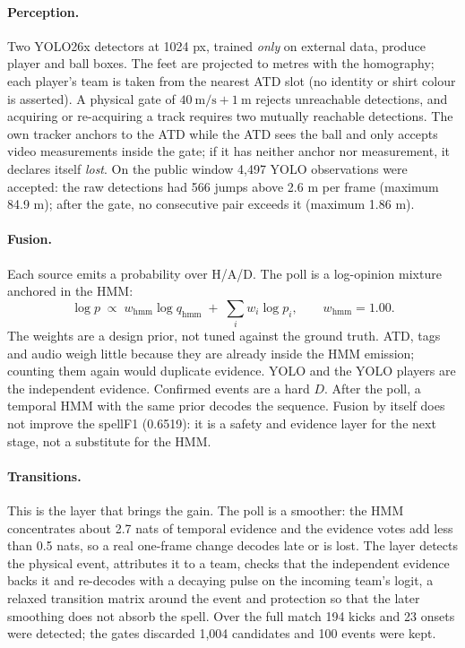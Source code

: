 \documentclass[10pt,a4paper]{article}
\begin{document}
\paragraph{Perception.} Two YOLO26x detectors at 1024 px, trained \emph{only} on external
data, produce player and ball boxes. The feet are projected to metres with the homography;
each player's team is taken from the nearest ATD slot (no identity or shirt colour is
asserted). A physical gate of $40\ \mathrm{m/s}+1\ \mathrm{m}$ rejects unreachable
detections, and acquiring or re-acquiring a track requires two mutually reachable
detections. The own tracker anchors to the ATD while the ATD sees the ball and only accepts
video measurements inside the gate; if it has neither anchor nor measurement, it declares
itself \emph{lost}. On the public window 4,497 YOLO observations were accepted: the raw
detections had 566 jumps above 2.6 m per frame (maximum 84.9 m); after the gate, no
consecutive pair exceeds it (maximum 1.86 m).

\paragraph{Fusion.} Each source emits a probability over H/A/D. The poll is a log-opinion
mixture anchored in the HMM:
\begin{equation}
\log p \;\propto\; w_{\mathrm{hmm}}\log q_{\mathrm{hmm}}
\;+\;\sum_i w_i \log p_i,
\qquad w_{\mathrm{hmm}}=1.00 .
\label{eq:pool}
\end{equation}
The weights are a design prior, not tuned against the ground truth. ATD, tags and audio weigh
little because they are already inside the HMM emission; counting them again would duplicate
evidence. YOLO and the YOLO players are the independent evidence. Confirmed events are a hard
$D$. After the poll, a temporal HMM with the same prior decodes the sequence. Fusion by
itself does not improve the spellF1 (0.6519): it is a safety and evidence layer for the next
stage, not a substitute for the HMM.

\paragraph{Transitions.} This is the layer that brings the gain. The poll is a smoother: the
HMM concentrates about 2.7 nats of temporal evidence and the evidence votes add less than
0.5 nats, so a real one-frame change decodes late or is lost. The layer detects the physical
event, attributes it to a team, checks that the independent evidence backs it and re-decodes
with a decaying pulse on the incoming team's logit, a relaxed transition matrix around the
event and protection so that the later smoothing does not absorb the spell. Over the full
match 194 kicks and 23 onsets were detected; the gates discarded 1,004 candidates and 100
events were kept.
\end{document}
